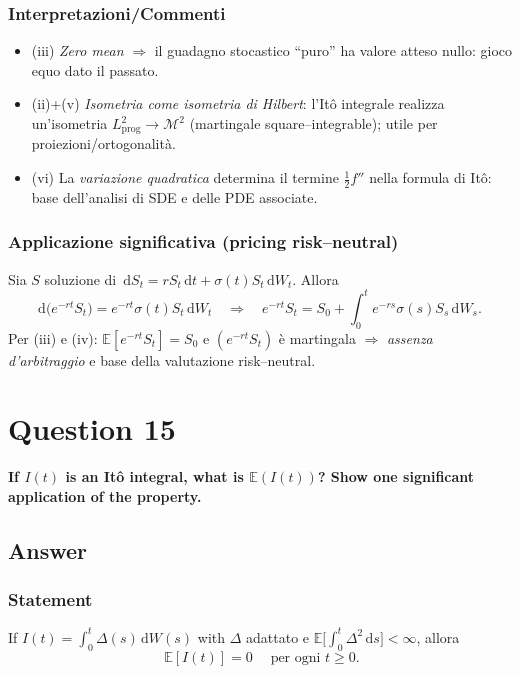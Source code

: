 \documentclass[12pt,a4paper]{book}
\theoremstyle{remark}
\newcommand{\EE}{\mathbb{E}}          %
\newcommand{\dd}{\mathrm{d}}
\begin{document}
\subsubsection*{Interpretazioni/Commenti}
\begin{itemize}
\item (iii) \emph{Zero mean} $\Rightarrow$ il guadagno stocastico “puro” ha valore atteso nullo: gioco equo dato il passato.
\item (ii)+(v) \emph{Isometria come isometria di Hilbert}: l’It\^o integrale realizza un’isometria $L^2_{\text{prog}} \to \mathcal{M}^2$ (martingale square–integrable); utile per proiezioni/ortogonalit\`a.
\item (vi) La \emph{variazione quadratica} determina il termine $\tfrac12 f''$ nella formula di It\^o: base dell’analisi di SDE e delle PDE associate.
\end{itemize}

\subsubsection*{Applicazione significativa (pricing risk–neutral)}
Sia $S$ soluzione di $\,\dd S_t = r S_t\,\dd t + \sigma(t) S_t\,\dd W_t.$ Allora
\[
\dd\big(e^{-rt}S_t\big)= e^{-rt}\sigma(t)S_t\,\dd W_t
\quad\Rightarrow\quad
e^{-rt}S_t = S_0 + \int_0^t e^{-rs}\sigma(s)S_s\,\dd W_s.
\]
Per (iii) e (iv): $\EE[e^{-rt}S_t]=S_0$ e $(e^{-rt}S_t)$ è martingala $\Rightarrow$ \emph{assenza d’arbitraggio} e base della valutazione risk–neutral.









\newpage
\section{Question 15}
\textbf{If $I(t)$ is an It\^o integral, what is $\EE(I(t))$? Show one significant application of the property.}

\subsection*{Answer}

\subsubsection*{Statement}
If $I(t)=\displaystyle \int_0^t \Delta(s)\,\dd W(s)$ with $\Delta$ adattato e $\EE\!\big[\int_0^t \Delta^2\,\dd s\big]<\infty$, allora
\[
\boxed{\;\EE[I(t)]=0\;}\quad \text{per ogni } t\ge 0.
\]
\end{document}
